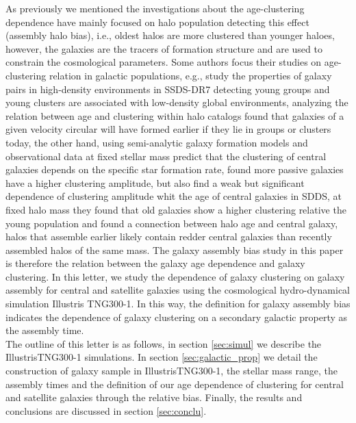 \documentclass[a4paper,fleqn,usenatbib]{mnras}
\begin{document}

As previously we mentioned the investigations about the age-clustering dependence have mainly focused on halo population detecting this effect (assembly halo bias), i.e., oldest halos are more clustered than younger haloes, however, the galaxies are the tracers of formation structure and are used to constrain the cosmological parameters. Some authors focus their studies on age-clustering relation in galactic populations, e.g., \citet{2012A&A...539A..46A} study the properties of galaxy pairs in high-density environments in SSDS-DR7 detecting young groups and young clusters are associated with low-density global environments, \citet{2007MNRAS.378..777R} analyzing the relation between age and clustering within halo catalogs found that galaxies of a given velocity circular will have formed earlier if they lie in groups or clusters today, the other hand, using semi-analytic galaxy formation models and observational data at fixed stellar mass \citet{2013MNRAS.433..515W} predict that the clustering of central galaxies depends on the specific star formation rate, found more passive galaxies have a higher clustering amplitude, but \citet{Lacerna_2014} also find a weak but significant dependence of clustering amplitude whit the age of central galaxies in SDDS, at fixed halo mass they found that old galaxies show a higher clustering relative the young population and \citet{Berlind:2006eb} found a connection between halo age and central galaxy, halos that assemble earlier likely contain redder central galaxies than recently assembled halos of the same mass. The galaxy assembly bias study in this paper is therefore the relation between the galaxy age dependence and galaxy clustering. In this letter, we study the dependence of galaxy clustering on galaxy assembly for central and satellite galaxies using the cosmological hydro-dynamical simulation Illustris TNG300-1. In this way, the definition for galaxy assembly bias indicates the dependence of galaxy clustering on a secondary galactic property as the assembly time.\\

The outline of this letter is as follows, in section \ref{sec:simul} we describe the IllustrisTNG300-1 simulations. In section \ref{sec:galactic_prop} we detail the construction of galaxy sample in IllustrisTNG300-1, the stellar mass range, the assembly times and the definition of our age dependence of clustering for central and satellite galaxies through the relative bias. Finally, the results and conclusions are discussed in section \ref{sec:conclu}.
\end{document}
